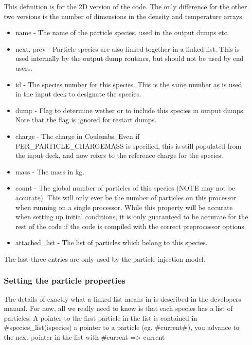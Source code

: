 \documentclass[12pt,a4paper]{article}
\newcommand{\EPOCH}{{\color{warwickdark}\fontfamily{phv}\selectfont{EPOCH}}}
\begin{document}
This definition is for the 2D version of the code. The only difference for
the other two versions is the number of dimensions in the density and
temperature arrays.

\begin{itemize}
\item name - The name of the particle species, used in the output dumps etc.
\item next, prev - Particle species are also linked together in a linked
  list. This is used internally by the output dump routines, but should not be
  used by end users.
\item id - The species number for this species. This is the same number as is
  used in the input deck to designate the species.
\item dump - Flag to determine wether or to include this species in output
  dumps. Note that the flag is ignored for restart dumps.
\item charge - The charge in Coulombs. Even if PER\_PARTICLE\_CHARGEMASS is
  specified, this is still populated from the input deck, and now refers to
  the reference charge for the species.
\item mass - The mass in kg.
\item count - The global number of particles of this species (NOTE may not
  be accurate). This will only ever be the number of particles on this
  processor when running on a single processor. While this property will be
  accurate when setting up initial conditions, it is only guaranteed to be
  accurate for the rest of the code if the code is compiled with the correct
  preprocessor options.
\item attached\_list - The list of particles which belong to this species.
\end{itemize}

The last three entries are only used by the particle injection model.

\subsubsection{Setting the particle properties}
The details of exactly what a linked list means in {\EPOCH} is described
in the developers manual. For now, all we really need to know is that each
species has a list of particles. A pointer to the first particle in the list
is contained in #species_list(ispecies)%
a pointer to a particle (eg. #current#), you advance to the next pointer in
the list with #current => current%
\end{document}
